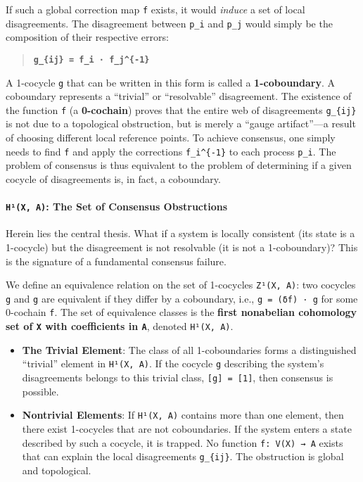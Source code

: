 \documentclass[
]{article}
\begin{document}
If such a global correction map \texttt{f} exists, it would
\emph{induce} a set of local disagreements. The disagreement between
\texttt{p\_i} and \texttt{p\_j} would simply be the composition of their
respective errors:

\begin{quote}
\textbf{\texttt{g\_\{ij\}\ =\ f\_i\ ·\ f\_j\^{}\{-1\}}}
\end{quote}

A 1-cocycle \texttt{g} that can be written in this form is called a
\textbf{1-coboundary}. A coboundary represents a ``trivial'' or
``resolvable'' disagreement. The existence of the function \texttt{f} (a
\textbf{0-cochain}) proves that the entire web of disagreements
\texttt{g\_\{ij\}} is not due to a topological obstruction, but is
merely a ``gauge artifact''---a result of choosing different local
reference points. To achieve consensus, one simply needs to find
\texttt{f} and apply the corrections \texttt{f\_i\^{}\{-1\}} to each
process \texttt{p\_i}. The problem of consensus is thus equivalent to
the problem of determining if a given cocycle of disagreements is, in
fact, a coboundary.

\paragraph{\texorpdfstring{\texttt{H¹(X,\ A)}: The Set of Consensus
Obstructions}{H¹(X, A): The Set of Consensus Obstructions}}\label{huxb9x-a-the-set-of-consensus-obstructions}

Herein lies the central thesis. What if a system is locally consistent
(its state is a 1-cocycle) but the disagreement is not resolvable (it is
not a 1-coboundary)? This is the signature of a fundamental consensus
failure.

We define an equivalence relation on the set of 1-cocycles
\texttt{Z¹(X,\ A)}: two cocycles \texttt{g} and
\texttt{g\textquotesingle{}} are equivalent if they differ by a
coboundary, i.e., \texttt{g\textquotesingle{}\ =\ (δf)\ ·\ g} for some
0-cochain \texttt{f}. The set of equivalence classes is the
\textbf{first nonabelian cohomology set of \texttt{X} with coefficients
in \texttt{A}}, denoted \texttt{H¹(X,\ A)}.

\begin{itemize}
\item
  \textbf{The Trivial Element}: The class of all 1-coboundaries forms a
  distinguished ``trivial'' element in \texttt{H¹(X,\ A)}. If the
  cocycle \texttt{g} describing the system's disagreements belongs to
  this trivial class, \texttt{{[}g{]}\ =\ {[}1{]}}, then consensus is
  possible.
\item
  \textbf{Nontrivial Elements}: If \texttt{H¹(X,\ A)} contains more than
  one element, then there exist 1-cocycles that are not coboundaries. If
  the system enters a state described by such a cocycle, it is trapped.
  No function \texttt{f:\ V(X)\ →\ A} exists that can explain the local
  disagreements \texttt{g\_\{ij\}}. The obstruction is global and
  topological.
\end{itemize}
\end{document}
